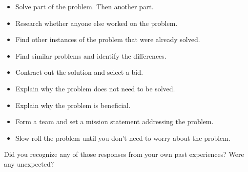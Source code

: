 \begin{itemize}
    \item Solve part of the problem. Then another part.
    \item Research whether anyone else worked on the problem.
    \item Find other instances of the problem that were already solved.
    \item Find similar problems and identify the differences.
    \item Contract out the solution and select a bid.
    \item Explain why the problem does not need to be solved.
    \item Explain why the problem is beneficial. 
    \item Form a team and set a mission statement addressing the problem.
    \item Slow-roll the problem until you don't need to worry about the problem. 
\end{itemize}


Did you recognize any of those responses from your own past experiences? 
Were any unexpected?